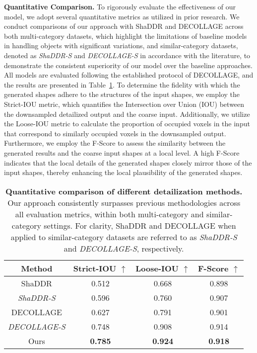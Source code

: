 \noindent\textbf{Quantitative Comparison.}
To rigorously evaluate the effectiveness of our model, we adopt several quantitative metrics as utilized in prior research. We conduct comparisons of our approach with ShaDDR and DECOLLAGE across both multi-category datasets, which highlight the limitations of baseline models in handling objects with significant variations, and similar-category datasets, denoted as \textit{ShaDDR-S} and \textit{DECOLLAGE-S} in accordance with the literature, to demonstrate the consistent superiority of our model over the baseline approaches. All models are evaluated following the established protocol of DECOLLAGE, and the results are presented in Table~\ref{tab:diverse}. 
To determine the fidelity with which the generated shapes adhere to the structures of the input shapes, we employ the Strict-IOU metric, which quantifies the Intersection over Union (IOU) between the downsampled detailized output and the coarse input. Additionally, we utilize the Loose-IOU metric to calculate the proportion of occupied voxels in the input that correspond to similarly occupied voxels in the downsampled output. 
Furthermore, we employ the F-Score to assess the similarity between the generated results and the coarse input shapes at a local level. A high F-Score indicates that the local details of the generated shapes closely mirror those of the input shapes, thereby enhancing the local plausibility of the generated shapes.

\begin{table}
    \centering
    \begin{tabular}{c|ccc}
        \hline
         Method & Strict-IOU $\uparrow$ & Loose-IOU $\uparrow$ & F-Score $\uparrow$ \\
         \hline
         ShaDDR &  0.512  &    0.668     &  0.898    \\
         \textit{ShaDDR-S} &  0.596  &    0.760     &  0.907    \\
         DECOLLAGE &  0.627    &   0.791      &  0.901    \\
         \textit{DECOLLAGE-S} &  0.748    &   0.908      &  0.914     \\
         Ours &  \textbf{0.785}   &    \textbf{0.924}    &  \textbf{0.918}   \\
         \hline
    \end{tabular}
    \caption{\textbf{Quantitative comparison of different detailization methods.} Our approach consistently surpasses previous methodologies across all evaluation metrics, within both multi-category and similar-category settings. For clarity, ShaDDR and DECOLLAGE when applied to similar-category datasets are referred to as \textit{ShaDDR-S} and \textit{DECOLLAGE-S}, respectively.}
    \label{tab:diverse}
\end{table}

